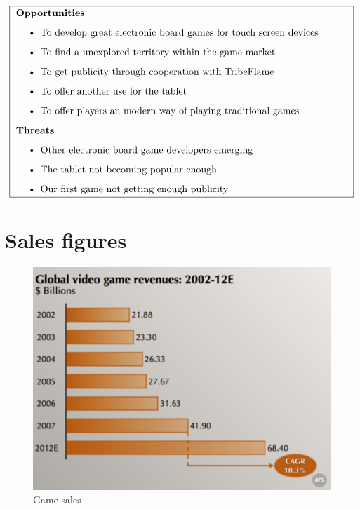 \documentclass[12pt,a4paper]{article}
\begin{document}
\[
\fbox{
\addtolength{\linewidth}{-2\fboxsep}%
\addtolength{\linewidth}{-2\fboxrule}%
\begin{minipage}{\linewidth}
{\bf Opportunities}
\begin{itemize}
\item To develop great electronic board games for touch screen devices
\item To find a unexplored territory within the game market
\item To get publicity through cooperation with TribeFlame
\item To offer another use for the tablet
\item To offer players an modern way  of playing traditional games
\end{itemize}

{\bf Threats}
\begin{itemize}
\item Other electronic board game developers emerging
\item The tablet not becoming popular enough
\item Our first game not getting enough publicity
\end{itemize}
\end{minipage}
}
\]

\pagebreak

\appendix
\section{Sales figures}

\begin{figure}[H]
  \centering
  \includegraphics[width=14cm]{pic/bplan_02.pdf}
  \caption{Game sales}
  \label{fig:gamesale}
\end{figure}
\end{document}

